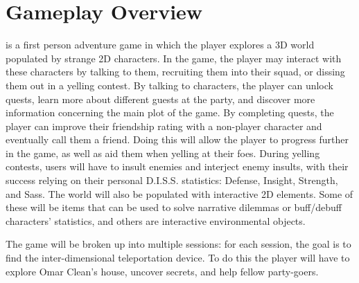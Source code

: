 \section{Gameplay Overview}
\ourgame{} is a first person adventure game in which the player explores a 3D world populated by strange 2D characters. In the game, the player may interact with these characters by talking to them, recruiting them into their squad, or dissing them out in a yelling contest. By talking to characters, the player can unlock quests, learn more about different guests at the party, and discover more information concerning the main plot of the game. By completing quests, the player can improve their friendship rating with a non-player character and eventually call them a friend. Doing this will allow the player to progress further in the game, as well as aid them when yelling at their foes. During yelling contests, users will have to insult enemies and interject enemy insults, with their success relying on their personal D.I.S.S. statistics: Defense, Insight, Strength, and Sass. The world will also be populated with interactive 2D elements. Some of these will be items that can be used to solve narrative dilemmas or buff/debuff characters' statistics, and others are interactive environmental objects.

The game will be broken up into multiple sessions: for each session, the goal is to find the inter-dimensional teleportation device. To do this the player will have to explore Omar Clean's house, uncover secrets, and help fellow party-goers. 